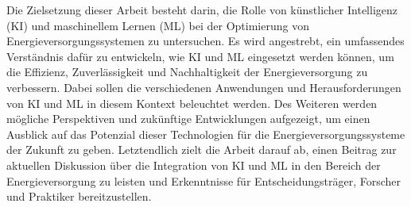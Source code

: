 Die Zielsetzung dieser Arbeit besteht darin, die Rolle von künstlicher
Intelligenz (KI) und maschinellem Lernen (ML) bei der Optimierung von
Energieversorgungssystemen zu untersuchen. Es wird angestrebt, ein umfassendes
Verständnis dafür zu entwickeln, wie KI und ML eingesetzt werden können, um die
Effizienz, Zuverlässigkeit und Nachhaltigkeit der Energieversorgung zu
verbessern. Dabei sollen die verschiedenen Anwendungen und Herausforderungen
von KI und ML in diesem Kontext beleuchtet werden. Des Weiteren werden mögliche
Perspektiven und zukünftige Entwicklungen aufgezeigt, um einen Ausblick auf das
Potenzial dieser Technologien für die Energieversorgungssysteme der Zukunft zu
geben. Letztendlich zielt die Arbeit darauf ab, einen Beitrag zur aktuellen
Diskussion über die Integration von KI und ML in den Bereich der
Energieversorgung zu leisten und Erkenntnisse für Entscheidungsträger, Forscher
und Praktiker bereitzustellen.